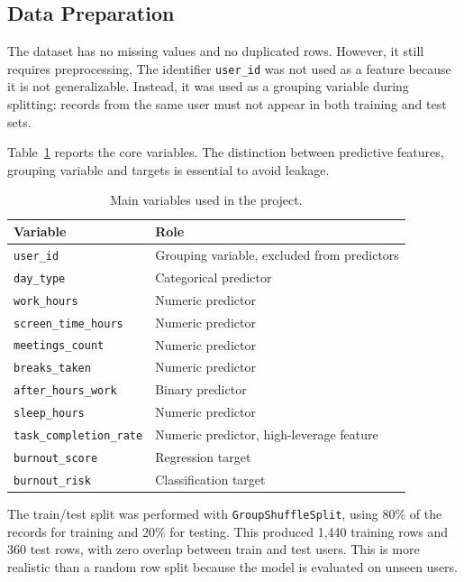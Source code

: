 \documentclass[conference]{IEEEtran}
\begin{document}
\subsection{Data Preparation}

The dataset has no missing values and no duplicated rows. However, it still
requires preprocessing, The identifier
\texttt{user\_id} was not used as a feature because it is not generalizable.
Instead, it was used as a grouping variable during splitting: records from the
same user must not appear in both training and test sets.

Table~\ref{tab:variables} reports the core variables. The distinction between
predictive features, grouping variable and targets is essential to avoid leakage.

\begin{table}[h]
\centering
\caption{Main variables used in the project.}
\label{tab:variables}
\begin{tabular}{ll}
\toprule
Variable & Role \\
\midrule
\texttt{user\_id} & Grouping variable, excluded from predictors \\
\texttt{day\_type} & Categorical predictor \\
\texttt{work\_hours} & Numeric predictor \\
\texttt{screen\_time\_hours} & Numeric predictor \\
\texttt{meetings\_count} & Numeric predictor \\
\texttt{breaks\_taken} & Numeric predictor \\
\texttt{after\_hours\_work} & Binary predictor \\
\texttt{sleep\_hours} & Numeric predictor \\
\texttt{task\_completion\_rate} & Numeric predictor, high-leverage feature \\
\texttt{burnout\_score} & Regression target \\
\texttt{burnout\_risk} & Classification target \\
\bottomrule
\end{tabular}
\end{table}

The train/test split was performed with \texttt{GroupShuffleSplit}, using 80\%
of the records for training and 20\% for testing. This produced 1,440 training
rows and 360 test rows, with zero overlap between train and test users. This is
more realistic than a random row split because the model is evaluated on unseen
users.
\end{document}
